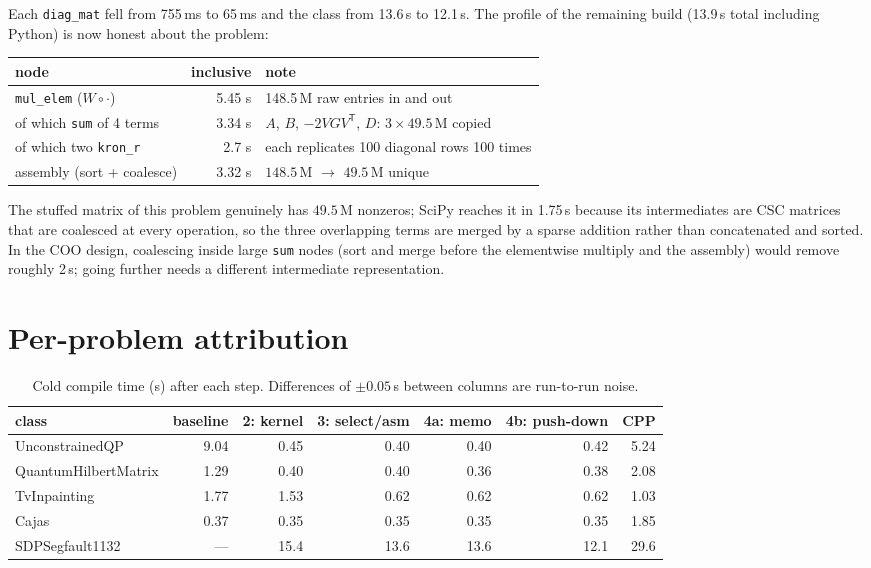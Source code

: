 \documentclass[11pt,a4paper]{article}
\newcommand{\code}[1]{\texttt{#1}}
\newcommand{\T}{\mathsf{T}}
\begin{document}
Each \code{diag\_mat} fell from 755\,ms to 65\,ms and the class from 13.6\,s to 12.1\,s. The
profile of the remaining build (13.9\,s total including Python) is now honest about the problem:
\begin{center}
\begin{tabular}{lrl}
\toprule
node & inclusive & note \\
\midrule
\code{mul\_elem} ($W\circ\cdot$) & 5.45 s & 148.5\,M raw entries in and out \\
\quad of which \code{sum} of 4 terms & 3.34 s & $A$, $B$, $-2VGV^\T$, $D$: $3\times49.5$\,M copied \\
\quad\quad of which two \code{kron\_r} & 2.7 s & each replicates 100 diagonal rows 100 times \\
assembly (sort + coalesce) & 3.32 s & $148.5$\,M $\to$ $49.5$\,M unique \\
\bottomrule
\end{tabular}
\end{center}
The stuffed matrix of this problem genuinely has $49.5$\,M nonzeros; SciPy reaches it in 1.75\,s
because its intermediates are CSC matrices that are coalesced at every operation, so the three
overlapping terms are merged by a sparse addition rather than concatenated and sorted. In the COO
design, coalescing inside large \code{sum} nodes (sort and merge before the elementwise multiply and
the assembly) would remove roughly 2\,s; going further needs a different intermediate representation.

\section{Per-problem attribution}

\begin{table}[H]
\centering
\footnotesize
\setlength{\tabcolsep}{5pt}
\begin{tabular}{lrrrrrr}
\toprule
class & baseline & 2: kernel & 3: select/asm & 4a: memo & 4b: push-down & CPP \\
\midrule
UnconstrainedQP & 9.04 & 0.45 & 0.40 & 0.40 & 0.42 & 5.24 \\
QuantumHilbertMatrix & 1.29 & 0.40 & 0.40 & 0.36 & 0.38 & 2.08 \\
TvInpainting & 1.77 & 1.53 & 0.62 & 0.62 & 0.62 & 1.03 \\
Cajas & 0.37 & 0.35 & 0.35 & 0.35 & 0.35 & 1.85 \\
SDPSegfault1132 & --- & 15.4 & 13.6 & 13.6 & 12.1 & 29.6 \\
\bottomrule
\end{tabular}
\caption{Cold compile time (s) after each step. Differences of $\pm 0.05$\,s between columns are
run-to-run noise.}
\end{table}
\end{document}
